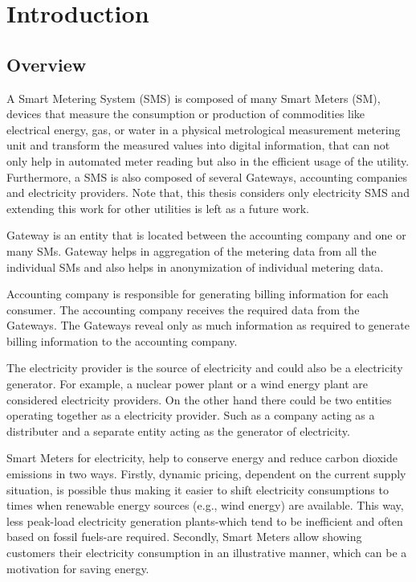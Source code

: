 \chapter{Introduction}
\section{Overview}
A Smart Metering System (SMS) is composed of many Smart Meters (SM), devices that measure the consumption or production of commodities like electrical energy, gas, or water in a physical metrological measurement metering unit and transform the measured values into digital information, that can not only help in automated meter reading but also in the efficient usage of the utility. Furthermore, a SMS is also composed of several Gateways, accounting companies and electricity providers. Note that, this thesis considers only electricity SMS and extending this work for other utilities is left as a future work.

Gateway is an entity that is located between the accounting company and one or many SMs. Gateway helps in aggregation of the metering data from all the individual SMs and also helps in anonymization of individual metering data.

Accounting  company is responsible for generating billing information for each consumer. The accounting company receives the required data from the Gateways. The Gateways reveal only as much information as required to generate billing information to the accounting company.

The electricity provider is the source of electricity and could also be a electricity generator. For example, a nuclear power plant or a wind energy plant are considered electricity providers. On the other hand there could be two entities operating together as a electricity provider. Such as a company acting as a distributer and a separate entity acting as the generator of electricity.

Smart Meters for electricity, help to conserve energy and reduce carbon dioxide emissions in two ways. Firstly, dynamic pricing, dependent on the current supply situation, is possible thus making it easier to shift electricity consumptions to times when renewable energy sources (e.g., wind energy) are available. This way, less peak-load electricity generation plants-which tend to be inefficient and often based on fossil fuels-are required. Secondly, Smart Meters allow showing customers their electricity consumption in an illustrative manner, which can be a motivation for saving energy.

